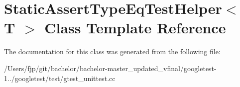 \hypertarget{class_static_assert_type_eq_test_helper}{}\section{Static\+Assert\+Type\+Eq\+Test\+Helper$<$ T $>$ Class Template Reference}
\label{class_static_assert_type_eq_test_helper}


The documentation for this class was generated from the following file\+:\begin{DoxyCompactItemize}
\item 
/\+Users/fjp/git/bachelor/bachelor-\/master\+\_\+updated\+\_\+vfinal/googletest-\/1../googletest/test/gtest\+\_\+unittest.\+cc\end{DoxyCompactItemize}
